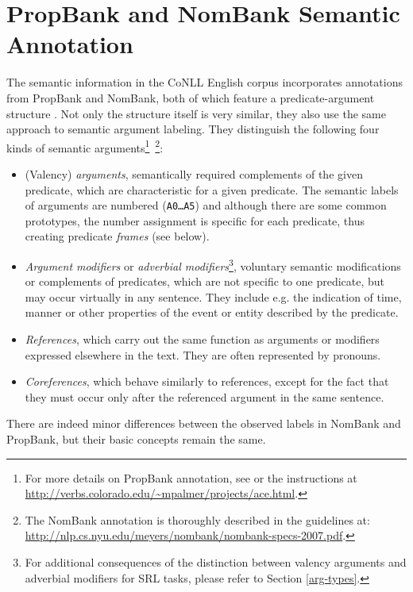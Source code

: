 \documentclass[12pt,notitlepage]{report}
\begin{document}
\section{PropBank and NomBank Semantic Annotation}\label{propbank-nombank}

The semantic information in the CoNLL English corpus incorporates annotations from PropBank and NomBank, both of which feature a predicate-argument structure \citep[cf. Section \ref{problem} and][]{kingsbury02}. Not only the structure itself is very similar, they also use the same approach to semantic argument labeling. They distinguish the following four kinds of semantic arguments\footnote{For more details on PropBank annotation, see \citep{moreda06} or the instructions at \url{http://verbs.colorado.edu/~mpalmer/projects/ace.html}.}~\footnote{The NomBank annotation is thoroughly described in the guidelines at: \\ \url{http://nlp.cs.nyu.edu/meyers/nombank/nombank-specs-2007.pdf}.}:
\begin{itemize} 
    \item (Valency) \emph{arguments}, semantically required complements of the given predicate, which are characteristic for a given predicate. The semantic labels of arguments are numbered (\texttt{A0\dots A5}) and although there are some common prototypes, the number assignment is specific for each predicate, thus creating predicate \emph{frames} (see below).
    \item \emph{Argument modifiers} or \emph{adverbial modifiers}\footnote{For additional consequences of the distinction between valency arguments and adverbial modifiers for SRL tasks, please refer to Section \ref{arg-types}.}, voluntary semantic modifications or complements of predicates, which are not specific to one predicate, but may occur virtually in any sentence. They include e.g. the indication of time, manner or other properties of the event or entity described by the predicate.
    \item \emph{References}, which carry out the same function as arguments or modifiers expressed elsewhere in the text. They are often represented by pronouns.
    \item \emph{Coreferences}, which behave similarly to references, except for the fact that they must occur only after the referenced argument in the same sentence.
\end{itemize}
There are indeed minor differences between the observed labels in NomBank and PropBank, but their basic concepts remain the same.
\end{document}
